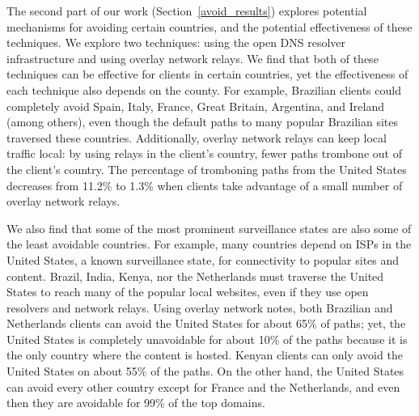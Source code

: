 The second part of our work (Section~\ref{avoid_results}) explores
potential mechanisms for avoiding certain countries, and the potential
effectiveness of these techniques.  We explore two techniques: using the
open DNS resolver infrastructure and using overlay network relays.  We
find that both of these techniques can be effective for clients in
certain countries, yet the effectiveness of each technique also depends
on the county.  For example, Brazilian clients could completely avoid
Spain, Italy, France, Great Britain, Argentina, and Ireland (among
others), even though the default paths to many popular Brazilian sites
traversed these countries. Additionally, overlay network relays can keep
local traffic local: by using relays in the client's country, fewer
paths trombone out of the client's country.  The percentage of
tromboning paths from the United States decreases from 11.2\% to 1.3\%
when clients take advantage of a small number of overlay network relays.

We also find that some of the most prominent surveillance states are
also some of the least avoidable countries.  For example, many countries
depend on ISPs in the United States, a known surveillance state, for
connectivity to popular sites and content.  Brazil, India, Kenya, nor
the Netherlands must traverse the United States to reach many of the
popular local websites, even if they use open resolvers and network
relays. Using overlay network notes, both Brazilian and Netherlands
clients can avoid the United States for about 65\% of paths; yet, the
United States is completely unavoidable for about 10\% of the paths
because it is the only country where the content is hosted.  Kenyan
clients can only avoid the United States on about 55\% of the paths.  On
the other hand, the United States can avoid every other country except
for France and the Netherlands, and even then they are avoidable for
99\% of the top domains.
